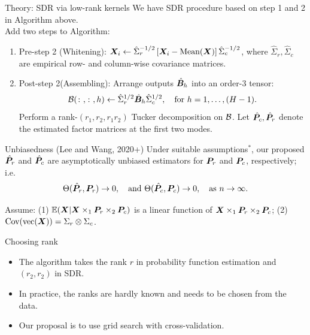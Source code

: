 \documentclass[compress,dvipsnames]{beamer}
\let\olditem\item
\renewcommand\item{\olditem\justifying}
\begin{document}
\begin{frame}{Theory: SDR via low-rank kernels}
We have SDR procedure based on  step 1 and 2 in Algorithm above.\\
Add two steps to Algorithm: 
\begin{enumerate}
\item Pre-step 2 (Whitening): $\bm{X}_i \leftarrow \hat \Sigma^{-1/2}_{r}\left[\bm{X}_i-\text{Mean}(\bm{X})\right]\hat \Sigma^{-1/2}_{c}$, where $\hat \Sigma_{r}, \hat \Sigma_{c}$ are empirical row- and column-wise covariance matrices.
\item Post-step 2(Assembling): Arrange outputs $\hat {\bm{B}}_h$ into an order-3 tensor:
\[
{\mathcal B}(\colon,\colon,h) \leftarrow \hat \Sigma^{1/2}_{r} \hat {\bm{B}}_h \hat \Sigma^{1/2}_{c},\quad \text{for }h=1,\ldots,(H-1).
\]
Perform a rank-$(r_1,r_2,r_1r_2)$ Tucker decomposition on ${\mathcal B}$. Let $\hat {\bm{P}}_c, \hat {\bm{P}}_r$ denote the estimated factor matrices at the first two modes. 
\end{enumerate}

\begin{block}{Unbiasedness (Lee and Wang, 2020+)}
Under suitable assumptions$^*$, our proposed $\hat {\bm{P}}_r$ and $\hat {\bm{P}}_c$ are asymptotically unbiased estimators for $\bm{P}_r$ and $\bm{P}_c$, respectively; i.e.
\[
\Theta(\hat {\bm{P}}_r,\bm{P}_r)\rightarrow 0, \quad \text{and}\ \Theta(\hat {\bm{P}}_c,\bm{P}_c)\rightarrow 0,\quad \text{as }n\to \infty.
\]
\end{block}

{\scriptsize Assume: (1) $\mathbb{E}(\bm{X}|\bm{X}\times_1\bm{P}_r\times_2\bm{P}_c)$ is a linear function of $\bm{X}\times_1\bm{P}_r\times_2\bm{P}_c$; (2) $\text{Cov}(\text{vec}(\bm{X}))=\Sigma_r\otimes \Sigma_c$}.
\end{frame}

\begin{frame}{Choosing rank}
\begin{itemize}
\item The algorithm takes the rank $r$ in probability function estimation and $(r_2,r_2)$ in SDR.
\item In practice, the ranks are hardly known and needs to be chosen from the data.
\item Our proposal is to use grid search with cross-validation.
\end{itemize}
\end{frame}
\end{document}
